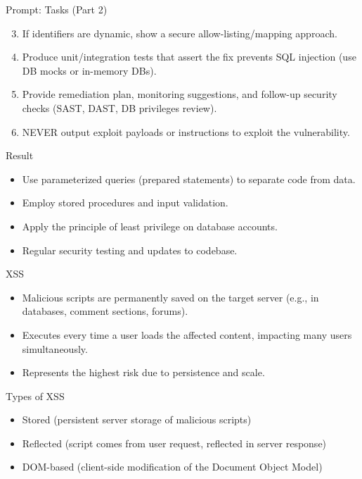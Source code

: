\documentclass[t,ignorenonframetext]{beamer}
\begin{document}
\begin{frame}{Prompt: Tasks (Part 2)}
\begin{tcolorbox}[colback=blue!5!white,colframe=navy!75!black,title=Tasks Continued]
  \begin{enumerate}
    \setcounter{enumi}{2} %

    \item If identifiers are dynamic, show a secure allow-listing/mapping approach.
    \item Produce unit/integration tests that assert the fix prevents SQL injection (use DB mocks or in-memory DBs).
    \item Provide remediation plan, monitoring suggestions, and follow-up security checks (SAST, DAST, DB privileges review).
    \item NEVER output exploit payloads or instructions to exploit the vulnerability.
  \end{enumerate}
\end{tcolorbox}
\end{frame}

\begin{frame}{Result}
\begin{itemize}
\item Use parameterized queries (prepared statements) to separate code from data.
\item Employ stored procedures and input validation.
\item Apply the principle of least privilege on database accounts.
\item Regular security testing and updates to codebase.
\end{itemize}
\end{frame}

\begin{frame}{XSS}
\begin{itemize}
  \item Malicious scripts are permanently saved on the target server (e.g., in databases, comment sections, forums).
    \item Executes every time a user loads the affected content, impacting many users simultaneously.
    \item Represents the highest risk due to persistence and scale.

\end{itemize}
\end{frame}
\begin{frame}{Types of XSS}
\begin{itemize}
    \item Stored (persistent server storage of malicious scripts)
    \item Reflected (script comes from user request, reflected in server response)
    \item DOM-based (client-side modification of the Document Object Model)
\end{itemize}
\end{frame}
\end{document}
